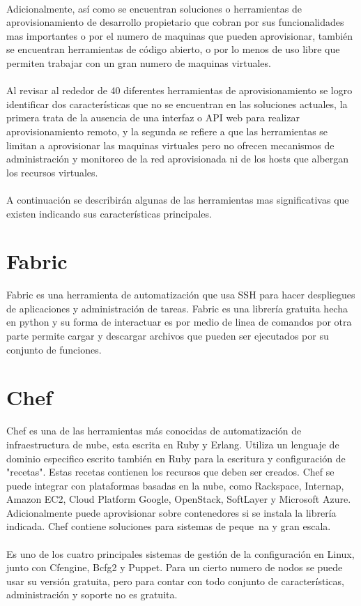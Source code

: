 \\
Adicionalmente, así como se encuentran soluciones o herramientas de aprovisionamiento de desarrollo propietario que cobran por sus funcionalidades mas importantes o por el numero de maquinas que pueden aprovisionar, también se encuentran herramientas de código abierto, o por lo menos de uso libre que permiten trabajar con un gran numero de maquinas virtuales.\\
\\
Al revisar al rededor de 40 diferentes herramientas de aprovisionamiento se logro identificar dos características que no se encuentran en las soluciones actuales, la primera trata de la ausencia de una interfaz o API web para realizar aprovisionamiento remoto, y la segunda se refiere a que las herramientas se limitan a aprovisionar las maquinas virtuales pero no ofrecen mecanismos de administración y monitoreo de la red aprovisionada ni de los hosts que albergan los recursos virtuales.\\
\\
A continuación se describirán algunas de las herramientas mas significativas que existen indicando sus características principales.

\section{Fabric}
Fabric \cite{fabfile16} es una herramienta de automatización que usa SSH para hacer despliegues de aplicaciones y administración de tareas. Fabric es una librería gratuita hecha en python y su forma de interactuar es por medio de linea de comandos por otra parte permite cargar y descargar archivos que pueden ser ejecutados por su conjunto de funciones.

\section{Chef}
Chef es una de las herramientas más conocidas de automatización de infraestructura de nube, esta escrita en Ruby y Erlang. Utiliza un lenguaje de dominio especifico escrito también en Ruby para la escritura y configuración de "recetas". Estas recetas contienen los recursos que deben ser creados. Chef se puede integrar con plataformas basadas en la nube, como Rackspace, Internap, Amazon EC2, Cloud Platform Google, OpenStack, SoftLayer y Microsoft Azure. Adicionalmente puede aprovisionar sobre contenedores si se instala la librería indicada. Chef contiene soluciones para sistemas de peque~na y gran escala. \cite{Chef15}\\
\\
Es uno de los cuatro principales sistemas de gestión de la configuración en Linux, junto con Cfengine, Bcfg2 y Puppet. Para un cierto numero de nodos se puede usar su versión gratuita, pero para contar con todo conjunto de características, administración y soporte no es gratuita.

